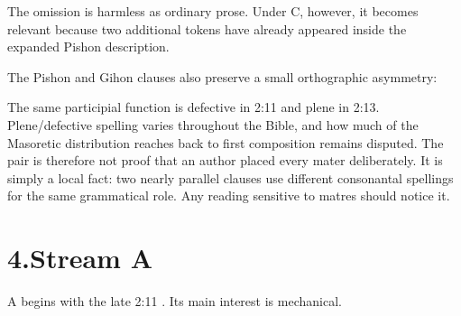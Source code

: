 
The omission is harmless as ordinary prose. Under C, however, it becomes relevant because two additional  tokens have already appeared inside the expanded Pishon description.

The Pishon and Gihon clauses also preserve a small orthographic asymmetry:


The same participial function is defective in 2:11 and plene in 2:13. Plene/defective spelling varies throughout the Bible, and how much of the Masoretic distribution reaches back to first composition remains disputed.\cite{Elitzur2023,Hornkohl2024} The pair is therefore not proof that an author placed every mater deliberately. It is simply a local fact: two nearly parallel clauses use different consonantal spellings for the same grammatical role. Any reading sensitive to matres should notice it.

\section*{4.\quad Stream A}

A begins with the late 2:11 . Its main interest is mechanical.


